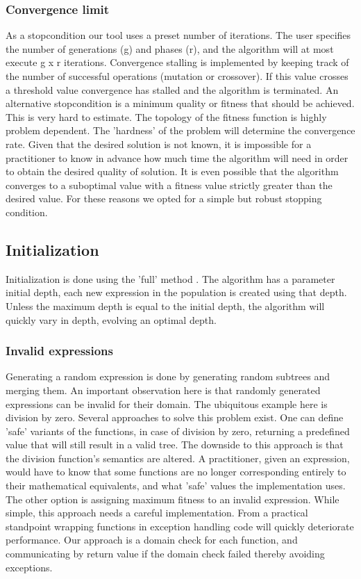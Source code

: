 \subsubsection{Convergence limit}
As a stopcondition our tool uses a preset number of iterations. The user specifies the number of generations (g) and phases (r), and the algorithm will at most execute g x r iterations. Convergence stalling is implemented by keeping track of the number of successful operations (mutation or crossover). If this value crosses a threshold value convergence has stalled and the algorithm is terminated. An alternative stopcondition is a minimum quality or fitness that should be achieved. This is very hard to estimate. The topology of the fitness function is highly problem dependent. The 'hardness' \citep{GPHardness} of the problem will determine the convergence rate. Given that the desired solution is not known, it is impossible for a practitioner to know in advance how much time the algorithm will need in order to obtain the desired quality of solution. It is even possible that the algorithm converges to a suboptimal value with a fitness value strictly greater than the desired value. For these reasons we opted for a simple but robust stopping condition.


\subsection{Initialization}
Initialization is done using the 'full' method \cite{GP}. The algorithm has a parameter initial depth, each new expression in the population is created using that depth. Unless the maximum depth is equal to the initial depth, the algorithm will quickly vary in depth, evolving an optimal depth. 
 
\subsubsection{Invalid expressions}\label{subsubinvalidexpressions}
Generating a random expression is done by generating random subtrees and merging them. An important observation here is that randomly generated expressions can be invalid for their domain. The ubiquitous example here is division by zero. Several approaches to solve this problem exist. One can define 'safe' variants of the functions, in case of division by zero, returning a predefined value that will still result in a valid tree. The downside to this approach is that the division function's semantics are altered. A practitioner, given an expression, would have to know that some functions are no longer corresponding entirely to their mathematical equivalents, and what 'safe' values the implementation uses.
The other option is assigning maximum fitness to an invalid expression. While simple, this approach needs a careful implementation. From a practical standpoint wrapping functions in exception handling code will quickly deteriorate performance. 
Our approach is a domain check for each function, and communicating by return value if the domain check failed thereby avoiding exceptions.

